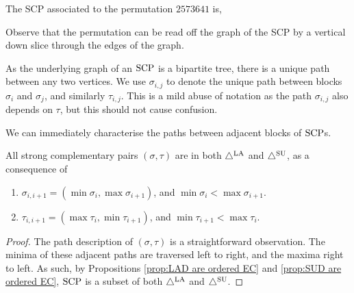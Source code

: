 \begin{example}
\label{ex:strong-complementary}
The SCP associated to the permutation $2573641$ is,
\begin{center}
\end{center}
Observe that the permutation can be read off the graph of the SCP by a vertical down slice through the edges of the graph.
\end{example}

As the underlying graph of an $\mathrm{SCP}$ is a bipartite tree, there is a unique path between any two vertices. 
We use $\sigma_{i,j}$ to denote the unique path between blocks $\sigma_{i}$ and $\sigma_j$, and similarly $\tau_{i,j}$. 
This is a mild abuse of notation as the path $\sigma_{i,j}$ also depends on $\tau$, but this should not cause confusion.

We can immediately characterise the paths between adjacent blocks of $\mathrm{SCP}$s.
\begin{lemma} \label{lem: SCP path desc}
All strong complementary pairs $(\sigma,\tau)$ are in both $\triangle^{\mathrm{LA}}$ and $\triangle^{\mathrm{SU}}$, as a consequence of
\begin{enumerate}
    \item $ \sigma_{i,i+1} = ( \min \sigma_i, \max \sigma_{i+1} )$, and $\min \sigma_i< \max \sigma_{i+1}$.
    \item $  \tau_{i,i+1} =  ( \max \tau_i, \min \tau_{i+1} )$, and $\min \tau_{i+1}< \max \tau_{i}$.
\end{enumerate}
\end{lemma}
\begin{proof}
The path description of $(\sigma,\tau)$ is a straightforward observation. The minima of these adjacent paths are traversed left to right, and the maxima right to left. As such, by Propositions \ref{prop:LAD are ordered EC} and \ref{prop:SUD are ordered EC}, $\mathrm{SCP}$ is a subset of both $\triangle^{\mathrm{LA}}$ and $\triangle^{\mathrm{SU}}$.
\end{proof}

